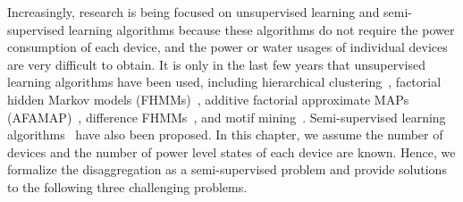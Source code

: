 Increasingly,  
research is being focused on unsupervised learning and semi-supervised learning algorithms because  
these algorithms do not require the power consumption of 
each device,   
and the power or water usages of individual devices are very difficult to obtain. 
It is only in
 the last few years that 
unsupervised learning algorithms
have been used, including
hierarchical clustering~\cite{gonccalves2011unsupervised},
factorial hidden Markov models (FHMMs)~\cite{kim2011unsupervised},
additive factorial approximate MAPs (AFAMAP)~\cite{kolter2012aistat}, 
difference FHMMs~\cite{parson2012nonintrusive}, 
and motif mining~\cite{shao2013temporal}.
Semi-supervised learning 
algorithms~\cite{lam2007novel,johnson2012bayesian} have also
been proposed.
In this chapter, we assume the number of devices 
and the number of power level states of each device 
are known. Hence, we formalize the disaggregation 
as a semi-supervised problem and 
provide solutions to the following three challenging problems.
